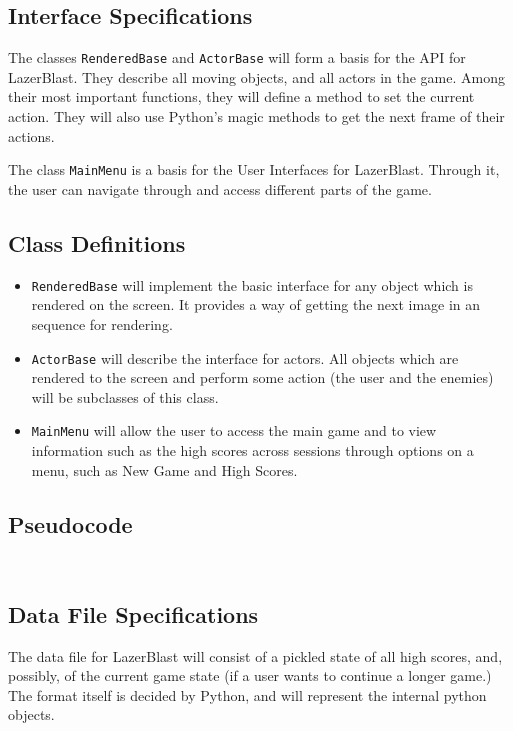 %
\subsection*{Interface Specifications}
    The classes \texttt{RenderedBase} and
    \texttt{ActorBase} will form a basis for
    the API for LazerBlast.  They describe all moving
    objects, and all actors in the game.  Among their
    most important functions, they will define a method
    to set the current action.  They will also use Python's
    magic methods to get the next frame of their actions.
    
    The class \texttt{MainMenu} is a basis for the User
    Interfaces for LazerBlast. Through it, the user can navigate
    through and access different parts of the game.

\subsection*{Class Definitions}
    \begin{itemize}
        \item \texttt{RenderedBase} will implement the basic
        interface for any object which is rendered on the screen.
        It provides a way of getting the next image in an sequence
        for rendering.
        \item \texttt{ActorBase} will describe the interface
        for actors.  All objects which are rendered to the screen and
        perform some action (the user and the enemies) will be subclasses
        of this class.
        \item \texttt{MainMenu} will allow the user to access
        the main game and to view information such as the high scores
        across sessions through options on a menu, such as New Game and
        High Scores.
    \end{itemize}

\subsection*{Pseudocode}
    \inputminted{python}{../assets/base_classes.py}
    \inputminted{python}{../assets/menus.py}

\subsection*{Data File Specifications}
    The data file for LazerBlast will consist of a
    pickled state of all high scores, and, possibly,
    of the current game state (if a user wants to
    continue a longer game.)  The format itself is
    decided by Python, and will represent the internal
    python objects.
